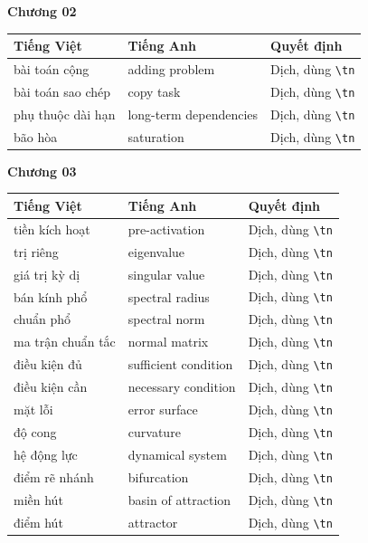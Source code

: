 \bigskip
\textbf{Chương 02}

\footnotesize
\begin{tabular}{@{}llp{4cm}@{}}
\toprule
Tiếng Việt & Tiếng Anh & Quyết định \\
\midrule
bài toán cộng & adding problem & Dịch, dùng \texttt{\textbackslash tn} \\
bài toán sao chép & copy task & Dịch, dùng \texttt{\textbackslash tn} \\
phụ thuộc dài hạn & long-term dependencies & Dịch, dùng \texttt{\textbackslash tn} \\
bão hòa & saturation & Dịch, dùng \texttt{\textbackslash tn} \\
\bottomrule
\end{tabular}
\normalsize

\bigskip
\textbf{Chương 03}

\footnotesize
\begin{tabular}{@{}llp{4cm}@{}}
\toprule
Tiếng Việt & Tiếng Anh & Quyết định \\
\midrule
tiền kích hoạt & pre-activation & Dịch, dùng \texttt{\textbackslash tn} \\
trị riêng & eigenvalue & Dịch, dùng \texttt{\textbackslash tn} \\
giá trị kỳ dị & singular value & Dịch, dùng \texttt{\textbackslash tn} \\
bán kính phổ & spectral radius & Dịch, dùng \texttt{\textbackslash tn} \\
chuẩn phổ & spectral norm & Dịch, dùng \texttt{\textbackslash tn} \\
ma trận chuẩn tắc & normal matrix & Dịch, dùng \texttt{\textbackslash tn} \\
điều kiện đủ & sufficient condition & Dịch, dùng \texttt{\textbackslash tn} \\
điều kiện cần & necessary condition & Dịch, dùng \texttt{\textbackslash tn} \\
mặt lỗi & error surface & Dịch, dùng \texttt{\textbackslash tn} \\
độ cong & curvature & Dịch, dùng \texttt{\textbackslash tn} \\
hệ động lực & dynamical system & Dịch, dùng \texttt{\textbackslash tn} \\
điểm rẽ nhánh & bifurcation & Dịch, dùng \texttt{\textbackslash tn} \\
miền hút & basin of attraction & Dịch, dùng \texttt{\textbackslash tn} \\
điểm hút & attractor & Dịch, dùng \texttt{\textbackslash tn} \\
\bottomrule
\end{tabular}
\normalsize

